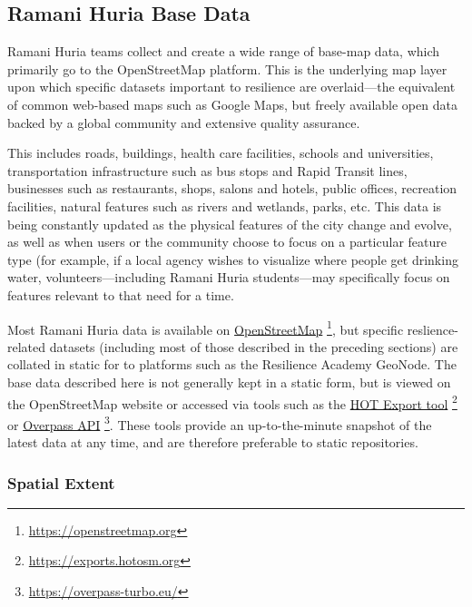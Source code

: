 \documentclass[a4paper,12pt,twoside]{article}
\begin{document}
\subsection{Ramani Huria Base Data}
\begin{multicols}{2}

Ramani Huria teams collect and create a wide range of base-map data, which primarily go to the OpenStreetMap platform. This is the underlying map layer upon which specific datasets important to resilience are overlaid---the equivalent of common web-based maps such as Google Maps, but freely available open data backed by a global community and extensive quality assurance. 

This includes roads, buildings, health care facilities, schools and universities, transportation infrastructure such as bus stops and Rapid Transit lines, businesses such as restaurants, shops, salons and hotels, public offices, recreation facilities, natural features such as rivers and wetlands, parks, etc. This data is being constantly updated as the physical features of the city change and evolve, as well as when users or the community choose to focus on a particular feature type (for example, if a local agency wishes to visualize where people get drinking water, volunteers---including Ramani Huria students---may specifically focus on features relevant to that need for a time.  

Most Ramani Huria data is available on \href{https://openstreetmap.org}{OpenStreetMap} \footnote{\url{https://openstreetmap.org}}, but specific reslience-related datasets (including most of those described in the preceding sections) are collated in static for  to platforms such as the Resilience Academy GeoNode. The base data described here is not generally kept in a static form, but is viewed on the OpenStreetMap website or accessed via tools such as the \href{https://exports.hotosm.org}{HOT Export tool} \footnote{\url{https://exports.hotosm.org}} or \href{https://overpass-turbo.eu/}{Overpass API} \footnote{\url{https://overpass-turbo.eu/}}. These tools provide an up-to-the-minute snapshot of the latest data at any time, and are therefore preferable to static repositories.

\end{multicols}

\subsubsection{Spatial Extent}
\end{document}
